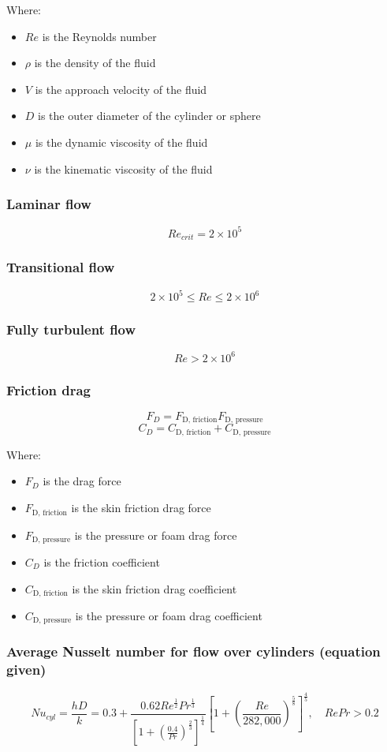 \documentclass[11pt]{article}
\begin{document}
Where:
\begin{itemize}
\item \(Re\) is the Reynolds number
\item \(\rho\) is the density of the fluid
\item \(V\) is the approach velocity of the fluid
\item \(D\) is the outer diameter of the cylinder or sphere
\item \(\mu\) is the dynamic viscosity of the fluid
\item \(\nu\) is the kinematic viscosity of the fluid
\end{itemize}
\subsubsection{Laminar flow}
\label{sec:org17f2cc6}
\[Re_{crit} = 2 \times 10^5\]
\subsubsection{Transitional flow}
\label{sec:org7201755}
\[2 \times 10^5 \le Re \le 2 \times 10^6\]
\subsubsection{Fully turbulent flow}
\label{sec:orgcddc03c}
\[Re > 2 \times 10^6\]
\subsubsection{Friction drag}
\label{sec:org1529c96}
\[F_D = F_{\text{D, friction}} F_{\text{D, pressure}}\]
\[C_D = C_{\text{D, friction}} + C_{\text{D, pressure}}\]

Where:
\begin{itemize}
\item \(F_D\) is the drag force
\item \(F_{\text{D, friction}}\) is the skin friction drag force
\item \(F_{\text{D, pressure}}\) is the pressure or foam drag force
\item \(C_D\) is the friction coefficient
\item \(C_{\text{D, friction}}\) is the skin friction drag coefficient
\item \(C_{\text{D, pressure}}\) is the pressure or foam drag coefficient
\end{itemize}
\subsubsection{Average Nusselt number for flow over cylinders (equation given)}
\label{sec:org8d1340e}
\[Nu_{cyl} = \frac{hD}{k} = 0.3 + \frac{0.62 Re^{\frac{1}{2}} Pr^{\frac{1}{3}}}{\left[1 + \left(\frac{0.4}{Pr} \right)^{\frac{2}{3}} \right]^{\frac{1}{4}}} \left[1 + \left(\frac{Re}{282,000} \right)^{\frac{5}{8}} \right]^{\frac{4}{5}}, \quad RePr > 0.2\]
\end{document}

